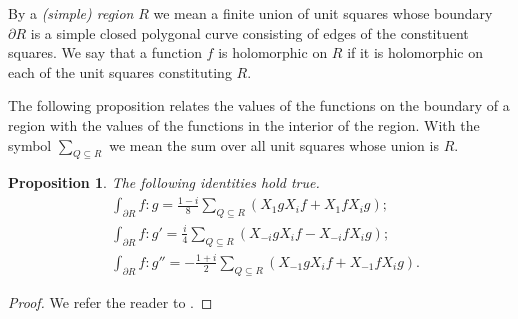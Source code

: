 \documentclass[12pt,a4paper,reqno]{amsart}
\newtheorem{prop}[thm]{Proposition}
\theoremstyle{definition}
\theoremstyle{definition}\newtheorem{defn}[thm]{Definition}
\newcommand{\nb}[3]{{\colorbox{#2}{\bfseries\sffamily\scriptsize\textcolor{white}{#1}}} 
    {\textcolor{#2}{\sf\small\textit{#3}}}}
\newcommand{\eug}[1]{\nb{Eug}{jazzberryjam}{#1}}
\begin{document}
    
    
     
    By a  \emph{(simple) region} $R$ we mean a finite union of unit squares whose boundary $\partial R$ is a simple closed polygonal curve consisting of edges of the constituent squares. We say that a function $f$ is holomorphic on $R$ if it is holomorphic on each of the unit squares constituting $R$.
    
    
    The following proposition relates the values of the functions on the boundary of a region with the values of the functions in the interior of the region.   With the symbol $\sum_{Q\subseteq R}$ we mean the sum  over all unit squares  whose union is $R$. 
    \begin{prop}\label{p:integrals_identities}
       The following identities hold true.
    \begin{align}
    \label{E:integrals_identities1}&\int_{\partial R} f:g= \frac{1-i}{8}\sum_{Q\subseteq R} (X_1gX_if+X_1fX_ig);\\
    \label{E:integrals_identities2}&\int_{\partial R}f:g'=\frac{i}{4}\sum_{Q\subseteq R}(X_{-i}gX_{i}f-X_{-i}fX_{i}g);\\
    \label{E:integrals_identities3}&\int_{\partial R}f:g''=-\frac{1+i}{2}\sum_{Q\subseteq R} (X_{-1}gX_{i}f+X_{-1}fX_{i}g).
    \end{align}
    \end{prop}
    \begin{proof}
    We refer the reader to \cite[Section 3]{D}.
    \end{proof}
    
\end{document}
